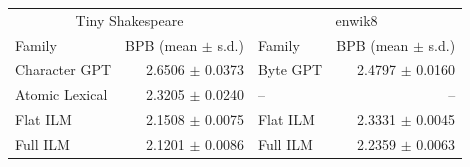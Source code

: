 \begin{tabular}{lr|lr}
\toprule
\multicolumn{2}{c|}{Tiny Shakespeare} & \multicolumn{2}{c}{enwik8} \\
Family & BPB (mean $\pm$ s.d.) & Family & BPB (mean $\pm$ s.d.) \\
\midrule
Character GPT & 2.6506 $\pm$ 0.0373 & Byte GPT & 2.4797 $\pm$ 0.0160 \\
Atomic Lexical & 2.3205 $\pm$ 0.0240 & -- & -- \\
Flat ILM & 2.1508 $\pm$ 0.0075 & Flat ILM & 2.3331 $\pm$ 0.0045 \\
Full ILM & 2.1201 $\pm$ 0.0086 & Full ILM & 2.2359 $\pm$ 0.0063 \\
\bottomrule
\end{tabular}

